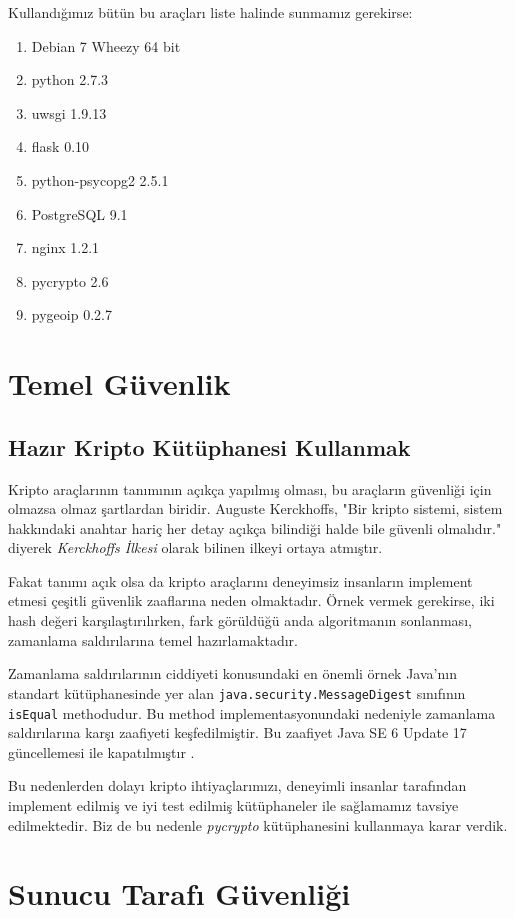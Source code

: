 \documentclass[11pt]{report}
\begin{document}
Kullandığımız bütün bu araçları liste halinde sunmamız gerekirse:

\begin{enumerate}
\item Debian 7 Wheezy 64 bit
\item python 2.7.3
\item uwsgi 1.9.13
\item flask 0.10
\item python-psycopg2 2.5.1
\item PostgreSQL 9.1
\item nginx 1.2.1
\item pycrypto 2.6
\item pygeoip 0.2.7
\end{enumerate}


\chapter{Temel Güvenlik}
\section{Hazır Kripto Kütüphanesi Kullanmak}
Kripto araçlarının tanımının açıkça yapılmış olması, bu araçların güvenliği için olmazsa olmaz şartlardan biridir. Auguste Kerckhoffs, "Bir kripto sistemi, sistem hakkındaki anahtar hariç her detay açıkça bilindiği halde bile güvenli olmalıdır."\cite{kerckhoffs} diyerek \emph{Kerckhoffs İlkesi} olarak bilinen ilkeyi ortaya atmıştır.

Fakat tanımı açık olsa da kripto araçlarını deneyimsiz insanların implement etmesi çeşitli güvenlik zaaflarına neden olmaktadır. Örnek vermek gerekirse, iki hash değeri karşılaştırılırken, fark görüldüğü anda algoritmanın sonlanması, zamanlama saldırılarına temel hazırlamaktadır.

Zamanlama saldırılarının ciddiyeti konusundaki en önemli örnek Java'nın standart kütüphanesinde yer alan \texttt{java.security.MessageDigest} sınıfının \texttt{isEqual} methodudur. Bu method implementasyonundaki nedeniyle zamanlama saldırılarına karşı zaafiyeti keşfedilmiştir. Bu zaafiyet Java SE 6 Update 17 güncellemesi ile kapatılmıştır \cite{javavul}.

Bu nedenlerden dolayı kripto ihtiyaçlarımızı, deneyimli insanlar tarafından implement edilmiş ve iyi test edilmiş kütüphaneler ile sağlamamız tavsiye edilmektedir. Biz de bu nedenle \emph{pycrypto} kütüphanesini kullanmaya karar verdik.

\chapter{Sunucu Tarafı Güvenliği}
\end{document}
